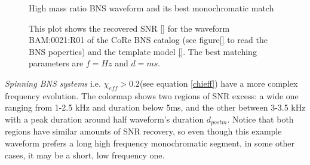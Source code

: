 \begin{figure}[!htbp]
\begin{center}
\begin{minipage}[t]{0.5\linewidth}
\end{minipage}
\captionsetup{width=0.8\textwidth}
\caption{High mass ratio BNS waveform and its best monochromatic match}
\caption*{This plot shows the recovered SNR \ref{} for the waveform BAM:0021:R01 of the CoRe BNS catalog \cite{}(see figure\ref{} to read the BNS poperties) and the template model \ref{}. The best matching parameters are $f=Hz$ and $d=ms$.}
\end{center}
\end{figure}

\FloatBarrier


\newpage

\textit{Spinning BNS systems} i.e. $\chi_{eff}>0.2$(see equation \ref{chieff}) have a more complex frequency evolution. The colormap shows two regions of SNR excess: a wide one ranging from 1-2.5 kHz and duration below 5ms, and the other between 3-3.5 kHz with a peak duration around half waveform's duration $d_{postm}$. Notice that both regions have similar amounts of SNR recovery, so even though this example waveform prefers a long high frequency monochromatic segment, in some other cases, it may be a short, low frequency one.

